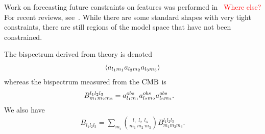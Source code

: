 Work on forecasting future constraints on features was performed
    in~\cite{Sohn_2019} \textcolor{red}{Where else?}
    For recent reviews, see~\cite{astro2020_png, astro2020_features, Ballardini_2017, Sypsas_2017,
    Palma_2017}.
    While there are some standard shapes with very tight constraints,
    there are still regions of the model space that have not been constrained.


    The bispectrum derived from theory is denoted
    \begin{align}
        \left<a_{l_1m_1}a_{l_2m_2}a_{l_3m_3}\right>
    \end{align}
    whereas the bispectrum measured from the $\text{CMB}$ is
    \begin{align}
        B^{l_1l_2l_3}_{m_1m_2m_3} &= a^{obs}_{l_1m_1}a^{obs}_{l_2m_2}a^{obs}_{l_3m_3}.
    \end{align}
    We also have
    \begin{align}\label{eq:bll}
        B_{l_1l_2l_3} = \sum_{m_i} {{l_1~~l_2~~l_3} \choose {m_1~m_2~m_3}} B^{l_1l_2l_3}_{m_1m_2m_3}.
    \end{align}


